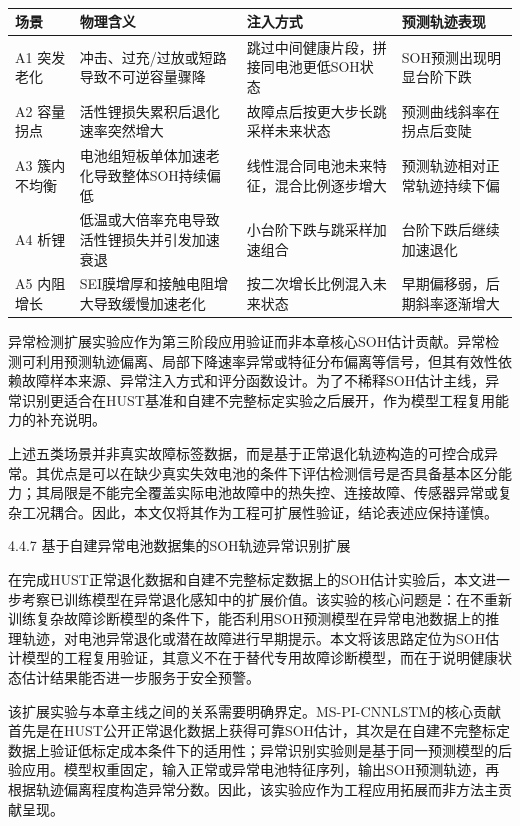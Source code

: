 \documentclass[12pt, a4paper]{ctexart}
\begin{document}


\begin{table}[H]
  \centering
  \begin{tabular}{llll}
  \toprule
  场景 & 物理含义 & 注入方式 & 预测轨迹表现 \\
  \midrule
  A1 突发老化 & 冲击、过充/过放或短路导致不可逆容量骤降 & 跳过中间健康片段，拼接同电池更低SOH状态 & SOH预测出现明显台阶下跌 \\
  A2 容量拐点 & 活性锂损失累积后退化速率突然增大 & 故障点后按更大步长跳采样未来状态 & 预测曲线斜率在拐点后变陡 \\
  A3 簇内不均衡 & 电池组短板单体加速老化导致整体SOH持续偏低 & 线性混合同电池未来特征，混合比例逐步增大 & 预测轨迹相对正常轨迹持续下偏 \\
  A4 析锂 & 低温或大倍率充电导致活性锂损失并引发加速衰退 & 小台阶下跌与跳采样加速组合 & 台阶下跌后继续加速退化 \\
  A5 内阻增长 & SEI膜增厚和接触电阻增大导致缓慢加速老化 & 按二次增长比例混入未来状态 & 早期偏移弱，后期斜率逐渐增大 \\
  \bottomrule
  \end{tabular}
  \caption{}
  \label{tab:}
\end{table}


异常检测扩展实验应作为第三阶段应用验证而非本章核心SOH估计贡献。异常检测可利用预测轨迹偏离、局部下降速率异常或特征分布偏离等信号，但其有效性依赖故障样本来源、异常注入方式和评分函数设计。为了不稀释SOH估计主线，异常识别更适合在HUST基准和自建不完整标定实验之后展开，作为模型工程复用能力的补充说明。


上述五类场景并非真实故障标签数据，而是基于正常退化轨迹构造的可控合成异常。其优点是可以在缺少真实失效电池的条件下评估检测信号是否具备基本区分能力；其局限是不能完全覆盖实际电池故障中的热失控、连接故障、传感器异常或复杂工况耦合。因此，本文仅将其作为工程可扩展性验证，结论表述应保持谨慎。


4.4.7 基于自建异常电池数据集的SOH轨迹异常识别扩展


在完成HUST正常退化数据和自建不完整标定数据上的SOH估计实验后，本文进一步考察已训练模型在异常退化感知中的扩展价值。该实验的核心问题是：在不重新训练复杂故障诊断模型的条件下，能否利用SOH预测模型在异常电池数据上的推理轨迹，对电池异常退化或潜在故障进行早期提示。本文将该思路定位为SOH估计模型的工程复用验证，其意义不在于替代专用故障诊断模型，而在于说明健康状态估计结果能否进一步服务于安全预警。


该扩展实验与本章主线之间的关系需要明确界定。MS-PI-CNNLSTM的核心贡献首先是在HUST公开正常退化数据上获得可靠SOH估计，其次是在自建不完整标定数据上验证低标定成本条件下的适用性；异常识别实验则是基于同一预测模型的后验应用。模型权重固定，输入正常或异常电池特征序列，输出SOH预测轨迹，再根据轨迹偏离程度构造异常分数。因此，该实验应作为工程应用拓展而非方法主贡献呈现。
\end{document}
